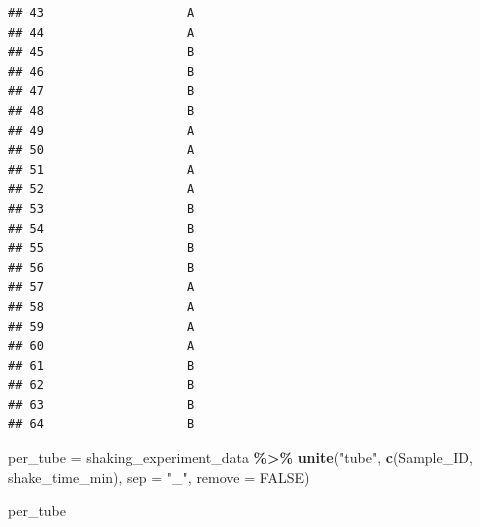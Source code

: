 \documentclass[
]{article}
\newenvironment{Shaded}{\begin{snugshade}}{\end{snugshade}}
\newcommand{\AttributeTok}[1]{\textcolor[rgb]{0.13,0.29,0.53}{#1}}
\newcommand{\ConstantTok}[1]{\textcolor[rgb]{0.56,0.35,0.01}{#1}}
\newcommand{\FunctionTok}[1]{\textcolor[rgb]{0.13,0.29,0.53}{\textbf{#1}}}
\newcommand{\NormalTok}[1]{#1}
\newcommand{\OtherTok}[1]{\textcolor[rgb]{0.56,0.35,0.01}{#1}}
\newcommand{\SpecialCharTok}[1]{\textcolor[rgb]{0.81,0.36,0.00}{\textbf{#1}}}
\newcommand{\StringTok}[1]{\textcolor[rgb]{0.31,0.60,0.02}{#1}}
\begin{document}
\begin{verbatim}
## 43                    A                                                      
## 44                    A                                                      
## 45                    B                                                      
## 46                    B                                                      
## 47                    B                                                      
## 48                    B                                                      
## 49                    A                                                      
## 50                    A                                                      
## 51                    A                                                      
## 52                    A                                                      
## 53                    B                                                      
## 54                    B                                                      
## 55                    B                                                      
## 56                    B                                                      
## 57                    A                                                      
## 58                    A                                                      
## 59                    A                                                      
## 60                    A                                                      
## 61                    B                                                      
## 62                    B                                                      
## 63                    B                                                      
## 64                    B
\end{verbatim}

\begin{Shaded}
\begin{Highlighting}[]
\NormalTok{per\_tube }\OtherTok{=}\NormalTok{ shaking\_experiment\_data }\SpecialCharTok{\%\textgreater{}\%}
  \FunctionTok{unite}\NormalTok{(}\StringTok{"tube"}\NormalTok{, }\FunctionTok{c}\NormalTok{(Sample\_ID, shake\_time\_min), }\AttributeTok{sep =} \StringTok{"\_"}\NormalTok{, }\AttributeTok{remove =} \ConstantTok{FALSE}\NormalTok{)}

\NormalTok{per\_tube}
\end{Highlighting}
\end{Shaded}
\end{document}

